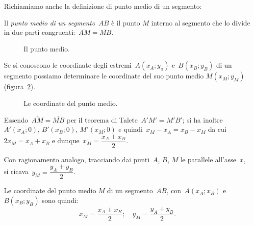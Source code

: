 Richiamiamo anche la definizione di punto medio di un segmento:
\begin{definizione}
 Il \emph{punto medio di un segmento}~$AB$ è il punto $M$ interno
al segmento che lo divide in due parti congruenti:~$\overline{AM}=\overline{MB}$.
\end{definizione}

  \begin{figure}[h]
  \centering
  \caption{Il punto medio.}\label{fig:8.16}
 \end{figure}

Se si conoscono le coordinate degli estremi~$A(x_A;y_a)$ e~$B(x_B;y_B)$ di un segmento possiamo determinare
le coordinate del suo punto medio $M(x_{M};y_{M})$ (figura~\ref{fig:8.17}).
\begin{figure}[hbt]
   \centering
  \caption{Le coordinate del punto medio.}\label{fig:8.17}
\end{figure}

Essendo~$\overline{AM}=\overline{MB}$ per il teorema di Talete~$\overline{A'M'}=\overline{M'B'}$;
si ha inoltre~$A'(x_{A};0)$, $B'(x_{B};0)$, $M'(x_{M};0)$ e quindi~$x_{M}-x_{A}=x_{B}-x_{M}$
da cui~$2x_{M}=x_{A}+x_{B}$ e dunque~$x_{M}=\dfrac{x_{A}+x_{B}}{2}$.

Con ragionamento analogo, tracciando dai punti~$A$, $B$, $M$ le parallele all'asse~$x$, si ricava~$y_{M}=\dfrac{y_{A}+y_{B}}{2}$.

Le coordinate del punto medio $M$ di un segmento~$AB$, con~$A(x_{A};x_{B})$ e $B(x_{B};y_{B})$ sono quindi:
\[x_{M}=\dfrac{x_{A}+x_{B}}{2};\quad y_{M}=\dfrac{y_{A}+y_{B}}{2}.\]


%
%
%

